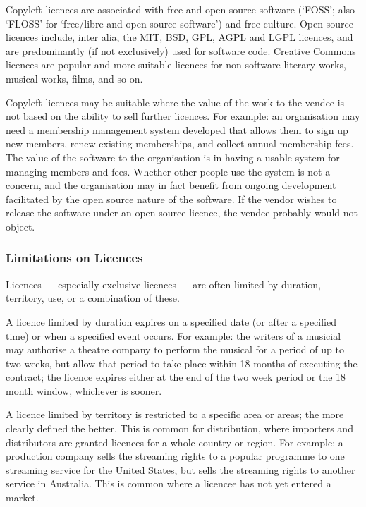 \documentclass[a4paper,12pt]{article}
\begin{document}
Copyleft licences are associated with free and open-source software (`FOSS'; also `FLOSS' for `free/libre and open-source software') and free culture. Open-source licences include, inter alia, the MIT, BSD, GPL, AGPL and LGPL licences, and are predominantly (if not exclusively) used for software code. Creative Commons licences are popular and more suitable licences for non-software literary works, musical works, films, and so on.

Copyleft licences may be suitable where the value of the work to the vendee is not based on the ability to sell further licences. For example: an organisation may need a membership management system developed that allows them to sign up new members, renew existing memberships, and collect annual membership fees. The value of the software to the organisation is in having a usable system for managing members and fees. Whether other people use the system is not a concern, and the organisation may in fact benefit from ongoing development facilitated by the open source nature of the software. If the vendor wishes to release the software under an open-source licence, the vendee probably would not object.

\subsubsection{Limitations on Licences}

Licences --- especially exclusive licences --- are often limited by duration, territory, use, or a combination of these.

A licence limited by duration expires on a specified date (or after a specified time) or when a specified event occurs. For example: the writers of a musicial may authorise a theatre company to perform the musical for a period of up to two weeks, but allow that period to take place within 18 months of executing the contract; the licence expires either at the end of the two week period or the 18 month window, whichever is sooner.

A licence limited by territory is restricted to a specific area or areas; the more clearly defined the better. This is common for distribution, where importers and distributors are granted licences for a whole country or region. For example: a production company sells the streaming rights to a popular programme to one streaming service for the United States, but sells the streaming rights to another service in Australia. This is common where a licencee has not yet entered a market.
\end{document}
